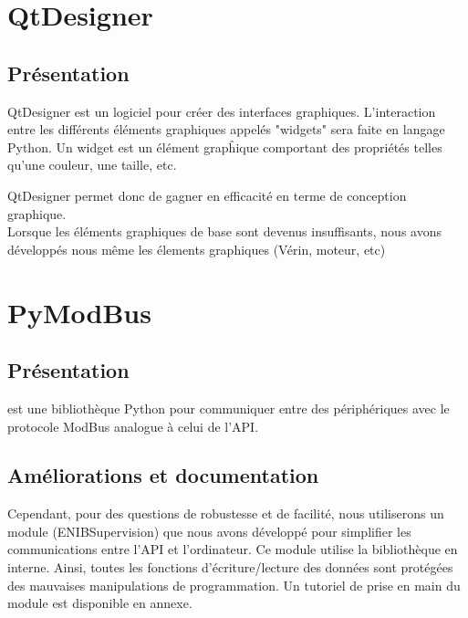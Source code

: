 \section{QtDesigner}

\subsection{Présentation}
QtDesigner est un logiciel pour créer des interfaces graphiques.\newline
L'interaction entre les différents éléments graphiques appelés "widgets" sera faite en langage Python. 
Un widget est un élément grapĥique comportant des propriétés telles qu'une couleur, une taille, etc. \newline \newline


QtDesigner permet donc de gagner en efficacité en terme de conception graphique. \\
Lorsque les éléments graphiques de base sont devenus insuffisants, nous avons développés nous même les élements graphiques (Vérin, moteur, etc)



\section{PyModBus}
\subsection{Présentation}
 est une bibliothèque Python pour communiquer entre des périphériques avec le protocole ModBus analogue à celui de l'API.

\subsection{Améliorations et documentation}

Cependant, pour des questions de robustesse et de facilité, nous utiliserons un module (ENIBSupervision) que nous avons développé pour simplifier les communications entre l'API et l'ordinateur. \newline
Ce module utilise la bibliothèque  en interne.
 Ainsi, toutes les fonctions d'écriture/lecture des données sont protégées des mauvaises manipulations de programmation. \newline
Un tutoriel de prise en main du module  est disponible en annexe.

